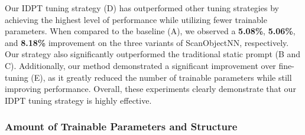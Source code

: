 \documentclass[10pt,twocolumn,letterpaper]{article}
\begin{document}
Our IDPT tuning strategy (D) has outperformed other tuning strategies by achieving the highest level of performance while utilizing fewer trainable parameters. When compared to the baseline (A), we observed a \textbf{5.08\%}, \textbf{5.06\%}, and \textbf{8.18\%} improvement on the three variants of ScanObjectNN, respectively. Our strategy also significantly outperformed the traditional static prompt (B and C). Additionally, our method demonstrated a significant improvement over fine-tuning (E), as it greatly reduced the number of trainable parameters while still improving performance. Overall, these experiments clearly demonstrate that our IDPT tuning strategy is highly effective.

\subsubsection{Amount of Trainable Parameters and Structure} 


\begin{table}[t]
  \centering
  \caption{Effects of the number of trainable parameters and the structure of prompt generation module.}
  \label{table5}\end{table}
\end{document}
